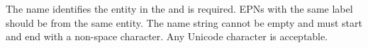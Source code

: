 The name identifies the entity in the
  \PDm and is required. EPNs with the same label should be from the same entity. The name
  string cannot be empty and must start and end with a non-space
  character. Any Unicode character is acceptable.